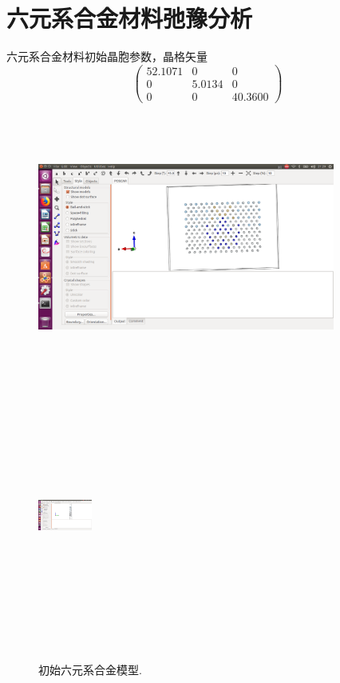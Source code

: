 \documentclass[10pt,a4paper]{article}
\begin{document}
\section{六元系合金材料弛豫分析}
六元系合金材料初始晶胞参数，晶格矢量
\begin{displaymath}
	\begin{pmatrix}
		52.1071    & 0       & 0\\
  0      & 5.0134     & 0\\
  0      &    0       & 40.3600 
	\end{pmatrix}
\end{displaymath}
\begin{figure}[h!]
\centering
\includegraphics[height=3.45in,width=3.85in,viewport=580 120 1130 690,clip]{Ni3Al_orig-1.png}
\hspace{0.1in}
\includegraphics[height=3.45in,width=0.7in,viewport=770 120 880 690,clip]{Ni3Al_orig-2.png}
\caption{\small 初始六元系合金模型.}%
\label{Ni:Ni3Al_orig}
\end{figure}
\end{document}
